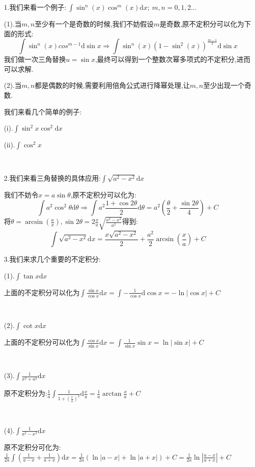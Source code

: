 \documentclass[oneside]{book}
\begin{document}
	1.我们来看一个例子:$\ \int \sin^{n}(x)\cos^{m}(x)\mathrm{d}x;\ m,n=0,1,2...$
	
	(1).当$m,n$至少有一个是奇数的时候,我们不妨假设$m$是奇数,原不定积分可以化为下面的形式:$$\int \sin^{n}(x)cos^{m-1}\mathrm{d}\sin x\Rightarrow \int \sin^{n}(x)(1-\sin^{2}(x))^{\frac{m-1}{2}}\mathrm{d}\sin x$$
	我们做一次三角替换$u=\sin x$,最终可以得到一个整数次幂多项式的不定积分,进而可以求解.
	
	(2).当$m,n$都是偶数的时候,需要利用倍角公式进行降幂处理,让$m,n$至少出现一个奇数.
	
	我们来看几个简单的例子:
	
	(i).$\int\sin^{2}x\cos^{2}\mathrm{d}x$
	
	(ii).$\int\cos^{2}x$
	
	\hspace{\fill}\
	
	2.我们来看三角替换的具体应用:$\int\sqrt{a^{2}-x^{2}}\mathrm{d}x$
	
	我们不妨令$x=a\sin \theta$,原不定积分可以化为:$$\int a^{2}\cos^{2}\theta\mathrm{d}\theta\Rightarrow \int a^{2}\frac{1+\cos 2\theta}{2}\mathrm{d}\theta=a^{2}(\frac{\theta}{2}+\frac{\sin 2\theta}{4})+C$$
	将$\theta=\arcsin(\frac{a}{x}),\sin2\theta=2\frac{x}{a}\sqrt{\frac{a^{2}-x^{2}}{a^{2}}}$得到:
	$$\int\sqrt{a^{2}-x^{2}}\mathrm{d}x=\frac{x\sqrt{a^{2}-x^{2}}}{2}+\frac{a^{2}}{2}\arcsin(\frac{x}{a})+C$$
	
	3.我们来求几个重要的不定积分:
	
	(1).$\int \tan x\mathrm{d}x$
	
	上面的不定积分可以化为$\int \frac{\sin x}{\cos x}\mathrm{d}x=\int -\frac{1}{\cos x}\mathrm{d}\cos x=-\ln |\cos x|+C$
	
	\hspace{\fill}\
	
	(2).$\int \cot x\mathrm{d}x$
	
	上面的不定积分可以化为$\int \frac{\cos x}{\sin x}\mathrm{d}x=\int \frac{1}{\sin x}\sin x=\ln |\sin x|+C$
	
	\hspace{\fill}\
	
	(3).$\int \frac{1}{x^{2}+a^{2}}\mathrm{d}x$
	
	原不定积分为:$\frac{1}{a}\int \frac{1}{1+(\frac{x}{a})^{2}}\mathrm{d}\frac{x}{a}=\frac{1}{a}\arctan \frac{x}{a}+C$
	
	\hspace{\fill}\
	
	(4).$\int \frac{1}{a^{2}-x^{2}}\mathrm{d}x$
	
	原不定积分可化为:$\frac{1}{2a}\int (\frac{1}{a-x}+\frac{1}{a+x})\mathrm{d}x=\frac{1}{2a}(\ln|a-x|+\ln|a+x|)+C=\frac{1}{2a}\ln|\frac{a-x}{a+x}|+C$
	
\end{document}
